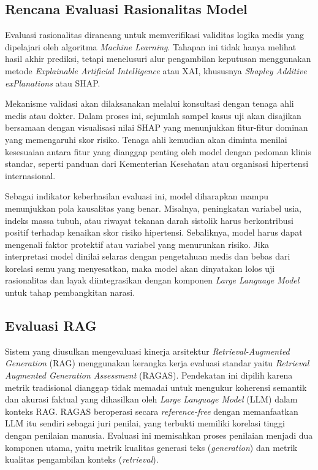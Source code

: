 \subsection{Rencana Evaluasi Rasionalitas Model}
Evaluasi rasionalitas dirancang untuk memverifikasi validitas logika medis yang dipelajari oleh algoritma \textit{Machine Learning}. Tahapan ini tidak hanya melihat hasil akhir prediksi, tetapi menelusuri alur pengambilan keputusan menggunakan metode \textit{Explainable Artificial Intelligence} atau XAI, khususnya \textit{Shapley Additive exPlanations} atau SHAP.

Mekanisme validasi akan dilaksanakan melalui konsultasi dengan tenaga ahli medis atau dokter. Dalam proses ini, sejumlah sampel kasus uji akan disajikan bersamaan dengan visualisasi nilai SHAP yang menunjukkan fitur-fitur dominan yang memengaruhi skor risiko. Tenaga ahli kemudian akan diminta menilai kesesuaian antara fitur yang dianggap penting oleh model dengan pedoman klinis standar, seperti panduan dari Kementerian Kesehatan atau organisasi hipertensi internasional.

Sebagai indikator keberhasilan evaluasi ini, model diharapkan mampu menunjukkan pola kausalitas yang benar. Misalnya, peningkatan variabel usia, indeks massa tubuh, atau riwayat tekanan darah sistolik harus berkontribusi positif terhadap kenaikan skor risiko hipertensi. Sebaliknya, model harus dapat mengenali faktor protektif atau variabel yang menurunkan risiko. Jika interpretasi model dinilai selaras dengan pengetahuan medis dan bebas dari korelasi semu yang menyesatkan, maka model akan dinyatakan lolos uji rasionalitas dan layak diintegrasikan dengan komponen \textit{Large Language Model} untuk tahap pembangkitan narasi.

\subsection{Evaluasi RAG}
Sistem yang diusulkan mengevaluasi kinerja arsitektur \textit{Retrieval-Augmented Generation} (RAG) menggunakan kerangka kerja evaluasi standar yaitu \textit{Retrieval Augmented Generation Assessment} (RAGAS). Pendekatan ini dipilih karena metrik tradisional dianggap tidak memadai untuk mengukur koherensi semantik dan akurasi faktual yang dihasilkan oleh \textit{Large Language Model} (LLM) dalam konteks RAG. RAGAS beroperasi secara \textit{reference-free} dengan memanfaatkan LLM itu sendiri sebagai juri penilai, yang terbukti memiliki korelasi tinggi dengan penilaian manusia. Evaluasi ini memisahkan proses penilaian menjadi dua komponen utama, yaitu metrik kualitas generasi teks (\textit{generation}) dan metrik kualitas pengambilan konteks (\textit{retrieval}).

